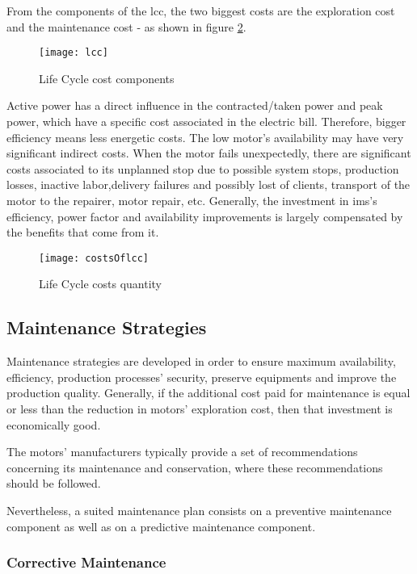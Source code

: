 From the components of the \acrshort{lcc}, the two biggest costs are the exploration cost and the maintenance cost - as shown in figure \ref{fig:costsOflcc}.

\begin{figure}[htbp]
	\centering
	\texttt{[image: lcc]}
	\caption{Life Cycle cost components}
	\label{fig:lcc}
\end{figure}

Active power has a direct influence in the contracted/taken power and peak power, which have a specific cost associated in the electric bill. Therefore, bigger efficiency means less energetic costs.
The low motor's availability may have very significant indirect costs. When the motor fails unexpectedly, there are significant costs associated to its unplanned stop due to possible system stops, production losses, inactive labor,delivery failures and possibly lost of clients, transport of the motor to the repairer, motor repair, etc. 
Generally, the investment in \acrshort{ims}'s efficiency, power factor and availability improvements is largely compensated by the benefits that come from it.
 
\begin{figure}[htbp]
	\centering
	\texttt{[image: costsOflcc]}
	\caption{Life Cycle costs quantity}
	\label{fig:costsOflcc}
\end{figure}

\subsection{Maintenance Strategies}
\label{subsec:maintenance}

Maintenance strategies are developed in order to ensure maximum availability, efficiency, production processes' security, preserve equipments and improve the production quality. Generally, if the additional cost paid for maintenance is equal or less than the reduction in motors' exploration cost, then that investment is economically good.

The motors' manufacturers typically provide a set of recommendations concerning its maintenance and conservation, where these recommendations should be followed.

Nevertheless, a suited maintenance plan consists on a preventive maintenance component as well as on a predictive maintenance component.

\subsubsection{Corrective Maintenance}
\label{subsubsec:corrective_maintenance}

